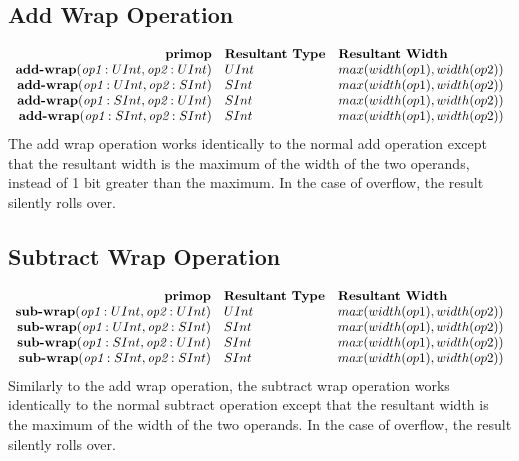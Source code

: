 \documentclass[10pt]{article}
\begin{document}
\subsection{Add Wrap Operation}
\[
\begin{array}{rll}
\text{\bf primop} & \text{\bf Resultant Type} & \text{\bf Resultant Width} \\
\text{\bf add-wrap}(\text{\em op1}:UInt, \text{\em op2}:UInt) & UInt & max(width(op1),width(op2)) \\
\text{\bf add-wrap}(\text{\em op1}:UInt, \text{\em op2}:SInt) & SInt & max(width(op1),width(op2)) \\
\text{\bf add-wrap}(\text{\em op1}:SInt, \text{\em op2}:UInt) & SInt & max(width(op1),width(op2)) \\
\text{\bf add-wrap}(\text{\em op1}:SInt, \text{\em op2}:SInt) & SInt & max(width(op1),width(op2)) \\
\end{array}
\]
The add wrap operation works identically to the normal add operation except that the resultant width is the maximum of the width of the two operands, instead of 1 bit greater than the maximum.
In the case of overflow, the result silently rolls over.

\subsection{Subtract Wrap Operation}
\[
\begin{array}{rll}
\text{\bf primop} & \text{\bf Resultant Type} & \text{\bf Resultant Width} \\
\text{\bf sub-wrap}(\text{\em op1}:UInt, \text{\em op2}:UInt) & UInt & max(width(op1),width(op2)) \\
\text{\bf sub-wrap}(\text{\em op1}:UInt, \text{\em op2}:SInt) & SInt & max(width(op1),width(op2)) \\
\text{\bf sub-wrap}(\text{\em op1}:SInt, \text{\em op2}:UInt) & SInt & max(width(op1),width(op2)) \\
\text{\bf sub-wrap}(\text{\em op1}:SInt, \text{\em op2}:SInt) & SInt & max(width(op1),width(op2)) \\
\end{array}
\]
Similarly to the add wrap operation, the subtract wrap operation works identically to the normal subtract operation except that the resultant width is the maximum of the width of the two operands.
In the case of overflow, the result silently rolls over.
\end{document}
